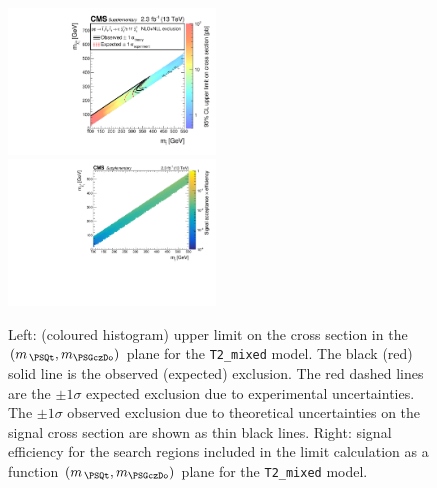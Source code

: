 \clearpage
\begin{figure}[!h]
  \begin{center}
    \includegraphics[width=0.49\textwidth]{Supplementary/RA1T2mixedXSEC_aux} \, 
    \includegraphics[width=0.49\textwidth]{Supplementary/T2mixed_merging_4_cats_aux} \,     
  \end{center}
  \caption{Left: (coloured histogram) upper limit on the cross section in the $(m_{\,\PSQt}, m_{\PSGczDo})$ plane for the \texttt{T2\_mixed} model. 
  The black (red) solid line is the observed (expected) exclusion. The red dashed lines are the $\pm1\sigma$ expected exclusion due to experimental uncertainties. 
  The $\pm1\sigma$ observed exclusion due to theoretical uncertainties on the signal cross section are shown as thin black lines. 
  Right: signal efficiency for the search regions included in the limit calculation as a function $(m_{\,\PSQt}, m_{\PSGczDo})$ plane for the \texttt{T2\_mixed} model. 
  \label{fig:T2mixed_excl}}
\end{figure}



